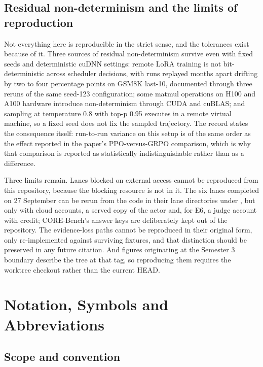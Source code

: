 \documentclass[12pt,a4paper]{report}
\newcommand{\longtok}[1]{\texttt{\seqsplit{#1}}}
\begin{document}
\section{Residual non-determinism and the limits of
reproduction}\label{residual-non-determinism-and-the-limits-of-reproduction}

Not everything here is reproducible in the strict sense, and the
tolerances exist because of it. Three sources of residual
non-determinism survive even with fixed seeds and deterministic cuDNN
settings: remote LoRA training is not bit-deterministic across scheduler
decisions, with runs replayed months apart drifting by two to four
percentage points on GSM8K last-10, documented through three reruns of
the same seed-123 configuration; some matmul operations on H100 and A100
hardware introduce non-determinism through CUDA and cuBLAS; and sampling
at temperature 0.8 with top-p 0.95 executes in a remote virtual machine,
so a fixed seed does not fix the sampled trajectory. The record states
the consequence itself: run-to-run variance on this setup is of the same
order as the effect reported in the paper's PPO-versus-GRPO comparison,
which is why that comparison is reported as statistically
indistinguishable rather than as a difference.

Three limits remain. Lanes blocked on external access cannot be
reproduced from this repository, because the blocking resource is not in
it. The six lanes completed on 27 September can be rerun from the code
in their lane directories under
\longtok{outputs/finish\_\allowbreak{}pending\_\allowbreak{}2026-09-27/}, but only with cloud
accounts, a served copy of the actor and, for E6, a judge account with
credit; CORE-Bench's answer keys are deliberately kept out of the
repository. The evidence-loss paths cannot be reproduced in their
original form, only re-implemented against surviving fixtures, and that
distinction should be preserved in any future citation. And figures
originating at the Semester 3 boundary describe the tree at that tag, so
reproducing them requires the worktree checkout rather than the current
HEAD.



\chapter{Notation, Symbols and
Abbreviations}\label{notation-symbols-and-abbreviations}

\section{Scope and convention}\label{scope-and-convention}
\end{document}
